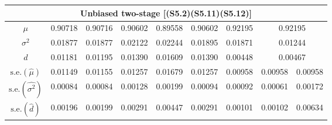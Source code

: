 \documentclass[11pt,a5paper,twoside]{book}
\begin{document}
\begin{table}[t!]
\begin{center}
\begin{tabular}{ccccccccc}
\hline\hline
\multicolumn{9}{c}{{Unbiased two-stage [(S5.2)(S5.11)(S5.12)]}}\\
\hline
$\mu$ & 0.90718 & 0.90716 & 0.90602 & 0.89558 & 0.90602 & 0.92195 & \multicolumn{2}{c}{0.92195}  \\
$\sigma^2$ & 0.01877 & 0.01877 & 0.02122 & 0.02244 & 0.01895 & 0.01871 & \multicolumn{2}{c}{0.01244}  \\
$d$ & 0.01181 & 0.01195 & 0.01390 & 0.01609 & 0.01390 & 0.00448 & \multicolumn{2}{c}{0.00467}  \\

\hline
$\mbox{s.e.}(\widehat{\mu})$& 0.01149 & 0.01155 & 0.01257 & 0.01679 & 0.01257 & 0.00958 & 0.00958 & 0.00958 \\
$\mbox{s.e.}(\widehat{\sigma^2})$  & 0.00084 & 0.00084 & 0.00128 & 0.00199 & 0.00094 & 0.00092 & 0.00061 & 0.00172 \\
  $\mbox{s.e.}(\widehat{d})$ & 0.00196 & 0.00199 & 0.00291 & 0.00447 & 0.00291 & 0.00101 & 0.00102 & 0.00634 \\

\hline\hline
\end{tabular}
\end{center}
\end{table}



\end{document}
